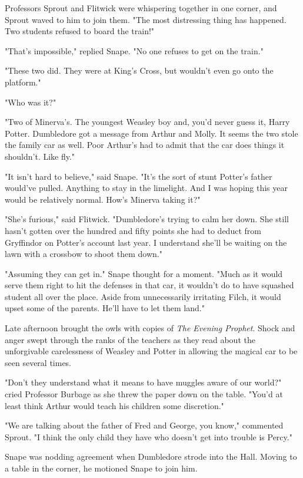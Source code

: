 Professors Sprout and Flitwick were whispering together in one corner, and Sprout waved to him to join them. "The most distressing thing has happened. Two students refused to board the train!"

"That's impossible," replied Snape. "No one refuses to get on the train."

"These two did. They were at King's Cross, but wouldn't even go onto the platform."

"Who was it?"

"Two of Minerva's. The youngest Weasley boy and, you'd never guess it, Harry Potter. Dumbledore got a message from Arthur and Molly. It seems the two stole the family car as well. Poor Arthur's had to admit that the car does things it shouldn't. Like fly."

"It isn't hard to believe," said Snape. "It's the sort of stunt Potter's father would've pulled. Anything to stay in the limelight. And I was hoping this year would be relatively normal. How's Minerva taking it?"

"She's furious," said Flitwick. "Dumbledore's trying to calm her down. She still hasn't gotten over the hundred and fifty points she had to deduct from Gryffindor on Potter's account last year. I understand she'll be waiting on the lawn with a crossbow to shoot them down."

"Assuming they can get in." Snape thought for a moment. "Much as it would serve them right to hit the defenses in that car, it wouldn't do to have squashed student all over the place. Aside from unnecessarily irritating Filch, it would upset some of the parents. He'll have to let them land."

Late afternoon brought the owls with copies of \emph{The Evening Prophet}. Shock and anger swept through the ranks of the teachers as they read about the unforgivable carelessness of Weasley and Potter in allowing the magical car to be seen several times.

"Don't they understand what it means to have muggles aware of our world?" cried Professor Burbage as she threw the paper down on the table. "You'd at least think Arthur would teach his children some discretion."

"We are talking about the father of Fred and George, you know," commented Sprout. "I think the only child they have who doesn't get into trouble is Percy."

Snape was nodding agreement when Dumbledore strode into the Hall. Moving to a table in the corner, he motioned Snape to join him.

